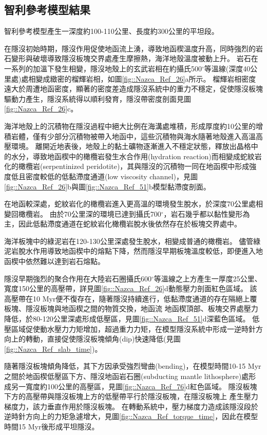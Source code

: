 \subsection{智利參考模型結果}\label{智利參考模型結果}
智利參考模型產生一深度約100-110公里、長度約300公里的平坦段。

在隱沒初始時期，隱沒作用促使地函流上湧，導致地函楔溫度升高，同時強烈的岩石變形與破壞導致隱沒板塊交界處產生摩擦熱，海洋地殼溫度被動上升。
岩石在一系列的加溫下發生相變，隱沒地殼上的玄武岩相在約攝氏500$^{\circ}$等溫線(深度40公里處)處相變成緻密的榴輝岩相，如圖\ref{fig::Nazca_Ref_26}a所示。
榴輝岩相密度遠大於周遭地函密度，顯著的密度差造成隱沒系統中的重力不穩定，促使隱沒板塊驅動力產生，隱沒系統得以順利發育，隱沒帶密度剖面見圖\ref{fig::Nazca_Ref_26}c。

海洋地殼上的沉積物在隱沒過程中絕大比例在海溝處堆積，形成厚度約10公里的增積岩體，僅有少部分沉積物被帶入地函中，這些沉積物與海水隨著地殼進入高溫高壓環境。
離開近地表後，地殼上的黏土礦物逐漸進入不穩定狀態，釋放出晶格中的水分，導致地函楔中的橄欖岩發生水合作用(hydration reaction)而相變成蛇紋岩化的橄欖岩(serpentinized peridotite)，其與隱沒的沉積物一同在地函楔中形成強度低且密度較低的低黏滯度通道(low viscosity channel)，見圖\ref{fig::Nazca_Ref_26}b與圖\ref{fig::Nazca_Ref_51}b模型黏滯度剖面。

在地函較深處，蛇紋岩化的橄欖岩進入更高溫的環境發生脫水，於深度70公里處相變回橄欖岩。
由於70公里深的環境已達到攝氏700$^{\circ}$，岩石幾乎都以黏性變形為主，因此低黏滯度通道在蛇紋岩化橄欖岩脫水後依然存在於板塊交界處中。

海洋板塊中的綠泥岩在120-130公里深處發生脫水，相變成普通的橄欖岩。
儘管綠泥岩脫水作用導致地函楔中的熔點下降，然而隱沒早期板塊溫度較低，即便進入地函楔中依然難以達到岩石熔點。

隱沒早期強烈的聚合作用在大陸岩石圈攝氏600$^{\circ}$等溫線之上方產生一厚度25公里、寬度150公里的高壓帶，詳見圖\ref{fig::Nazca_Ref_26}d動態壓力剖面紅色區域。
該高壓帶在10 Myr便不復存在，隨著隱沒持續進行，低黏滯度通道的存在隔絕上覆板塊、隱沒板塊與地函楔之間的物質交換，地函流
地函楔頂部、板塊交界處壓力降低，於80-120公里深處形成低壓區，見圖\ref{fig::Nazca_Ref_51}d深藍色區域。 
低壓區域促使動水壓力力矩增加，超過重力力矩，在模型隱沒系統中形成一逆時針方向上的轉動，直接促使隱沒板塊傾角(dip)快速降低(見圖\ref{fig::Nazca_Ref_slab_time})。

隨著隱沒板塊傾角降低，其下方因承受強烈彎曲(bending)，在模型時間10-15 Myr之間於地函楔低壓區下方、隱沒地函岩石圈(subducting mantle lithosphere)處形成另一寬度約100公里的高壓區，見圖\ref{fig::Nazca_Ref_76}d紅色區域。
隱沒板塊下方的高壓帶與隱沒板塊上方的低壓帶平行於隱沒板塊，在隱沒板塊上
產生壓力梯度力，該力垂直作用於隱沒板塊。
在轉動系統中，壓力梯度力造成該隱沒段於逆時針方向上的力矩急遽增大，見圖\ref{fig::Nazca_Ref_torque_time}，因此在模型時間15 Myr後形成平坦隱沒。

